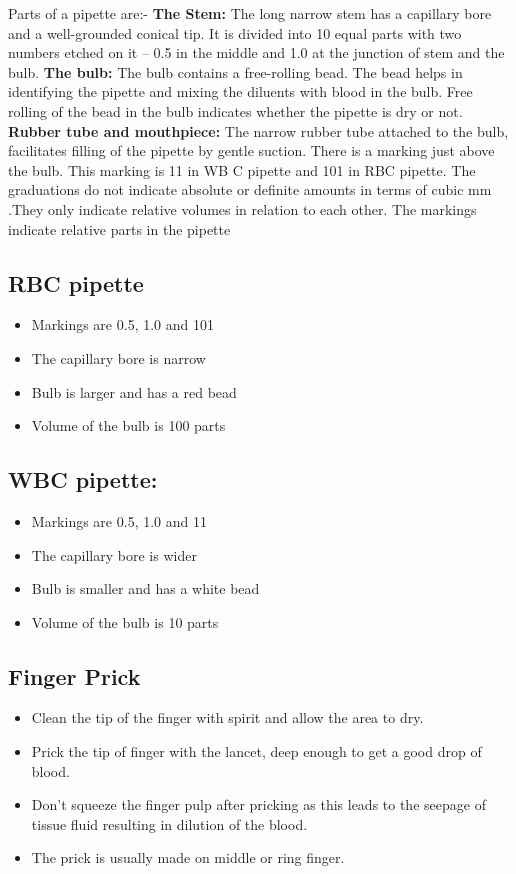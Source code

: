 \documentclass[a4paper,12pt]{book}
\begin{document}
Parts of a pipette are:-\newline
\textbf{The Stem:}
The long narrow stem has a capillary bore and a well-grounded conical tip. It is divided into 10 equal parts with two numbers etched on it – 0.5 in the middle and 1.0 at the junction of stem and the bulb.\newline
\textbf{The bulb:}
The bulb contains a free-rolling bead. The bead helps in identifying the pipette and mixing the diluents with blood in the bulb. Free rolling of the bead in the bulb indicates whether the pipette is dry or not.\newline
\textbf{Rubber tube and mouthpiece:}
The narrow rubber tube attached to the bulb, facilitates filling of the pipette by gentle suction. There is a marking just above the bulb. This marking is 11 in WB C pipette and 101 in RBC pipette. The graduations do not indicate absolute or definite amounts in terms of cubic mm .They only indicate relative volumes in relation to each other. The markings indicate relative parts in the pipette\newline

\subsection*{RBC pipette}
\begin{itemize}

	\item{Markings are 0.5, 1.0 and 101}
	\item{The capillary bore is narrow}
	\item{Bulb is larger and has a red bead}
	\item{Volume of the bulb is 100 parts}
\end{itemize}

\subsection*{WBC pipette:}
\begin{itemize}
	\item{Markings are 0.5, 1.0 and 11}
	\item{The capillary bore is wider}
	\item{Bulb is smaller and has a white bead}
	\item{Volume of the bulb is 10 parts}
\end{itemize}


\subsection*{Finger Prick}
\begin{itemize}
	\item{Clean the tip of the finger with spirit and allow the area to dry.}
	\item{Prick the tip of finger with the lancet, deep enough to get a good drop of blood.}
	\item{Don’t squeeze the finger pulp after pricking as this leads to the seepage of tissue fluid resulting in dilution of the blood.}
	\item{The prick is usually made on middle or ring finger.}
\end{itemize}
\end{document}
